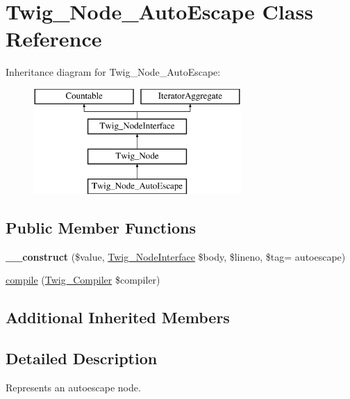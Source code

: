 \hypertarget{classTwig__Node__AutoEscape}{}\section{Twig\+\_\+\+Node\+\_\+\+Auto\+Escape Class Reference}
\label{classTwig__Node__AutoEscape}
Inheritance diagram for Twig\+\_\+\+Node\+\_\+\+Auto\+Escape\+:\begin{figure}[H]
\begin{center}
\leavevmode
\includegraphics[height=4.000000cm]{classTwig__Node__AutoEscape}
\end{center}
\end{figure}
\subsection*{Public Member Functions}
\begin{DoxyCompactItemize}
\item 
{\bfseries \+\_\+\+\_\+construct} (\$value, \hyperlink{interfaceTwig__NodeInterface}{Twig\+\_\+\+Node\+Interface} \$body, \$lineno, \$tag= \textquotesingle{}autoescape\textquotesingle{})\hypertarget{classTwig__Node__AutoEscape_ac22dfdb7d6d752cbfb4b1dbde5870057}{}\label{classTwig__Node__AutoEscape_ac22dfdb7d6d752cbfb4b1dbde5870057}

\item 
\hyperlink{classTwig__Node__AutoEscape_acd5e6a9672690afb0cf024c53482069b}{compile} (\hyperlink{classTwig__Compiler}{Twig\+\_\+\+Compiler} \$compiler)
\end{DoxyCompactItemize}
\subsection*{Additional Inherited Members}


\subsection{Detailed Description}
Represents an autoescape node.

